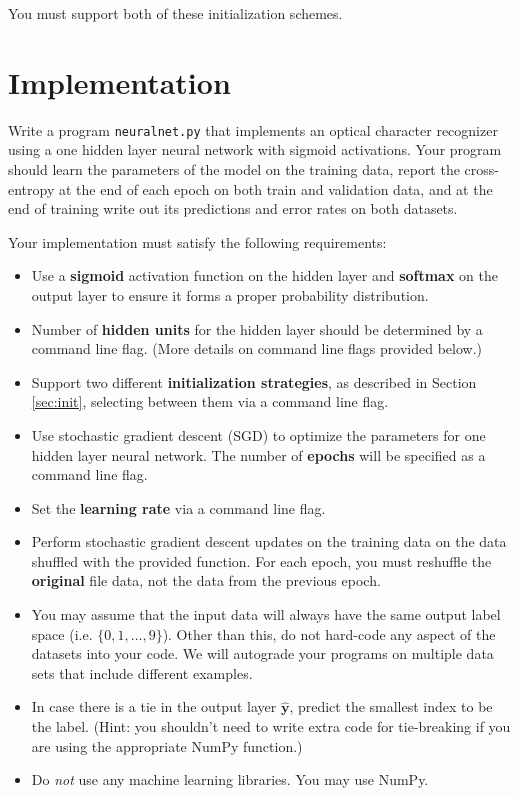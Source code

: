 \documentclass[11pt,addpoints,answers]{exam}
\newcommand{\yv}{\mathbf{y}}
\begin{document}
You must support both of these initialization schemes.

\section{Implementation}

Write a program \texttt{neuralnet.py} that implements an optical character recognizer using a one hidden layer neural network with sigmoid activations. Your program should learn the parameters of the model on the training data, report the cross-entropy at the end of each epoch on both train and validation data, and at the end of training write out its predictions and error rates on both datasets. 

Your implementation must satisfy the following requirements:

\begin{itemize}
    \item Use a {\bf sigmoid} activation function on the hidden layer and {\bf softmax} on the  output layer to ensure it forms a proper probability distribution.
    \item Number of {\bf hidden units} for the hidden layer should be determined by a command line flag. (More details on command line flags provided below.)
    \item Support two different {\bf initialization strategies}, as described in Section \ref{sec:init}, selecting between them via a command line flag.
    \item Use stochastic gradient descent (SGD) to optimize the parameters for one hidden layer neural network. The number of {\bf epochs} will be specified as a command line flag. 
    \item Set the {\bf learning rate} via a command line flag.
    \item Perform stochastic gradient descent updates on the training data on the data shuffled with the provided function. For each epoch, you must reshuffle the \textbf{original} file data, not the data from the previous epoch.
    \item You may assume that the input data will always have the same output label space (i.e. $\{0,1,\ldots,9\}$). Other than this, do not hard-code any aspect of the datasets into your code. We will autograde your programs on multiple data sets that include different examples.
    \item In case there is a tie in the output layer $\hat{\yv}$, predict the smallest index to be the label. (Hint: you shouldn't need to write extra code for tie-breaking if you are using the appropriate NumPy function.)
    \item Do \emph{not} use any machine learning libraries. You may use NumPy.
\end{itemize}
\end{document}
